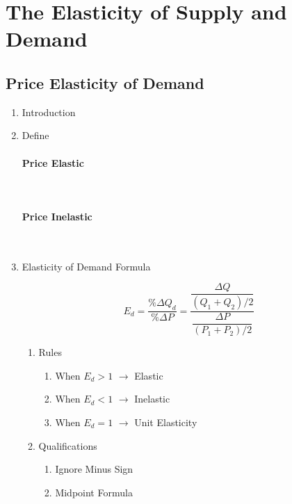 \newpage
\section{The Elasticity of Supply and Demand}

\subsection{Price Elasticity of Demand}

\begin{enumerate}[label = \textbf{(\Alph*)}, itemsep = 1em]

	\item Introduction
	\item Define

		\paragraph{Price Elastic} \ 
		\paragraph{Price Inelastic} \

	\item Elasticity of Demand Formula

		\[ E_d = \dfrac{\%\Delta Q_d}{ \%\Delta P} = \dfrac{\dfrac{\Delta Q}{(Q_1 + Q_2)/2}}{\dfrac{\Delta P}{(P_1 + P_2)/2}} \]

		\begin{enumerate}[label = \textbf{(\arabic*)}, itemsep = 1ex]
			\item Rules
				\begin{enumerate}[label = ---, itemsep = 1ex]
					\item When $E_d > 1$ $\longrightarrow$ Elastic
					\item When $E_d < 1$ $\longrightarrow$ Inelastic	
					\item When $E_d = 1$ $\longrightarrow$ Unit Elasticity
				\end{enumerate}

			\item Qualifications
				\begin{enumerate}[label = \textbf{(\alph*)}, itemsep = 1ex]
					\item Ignore Minus Sign
					\item Midpoint Formula
				\end{enumerate}
		\end{enumerate}


\end{enumerate}
